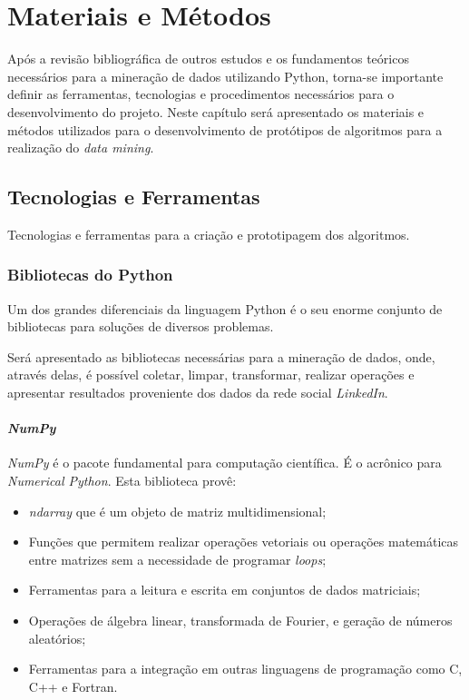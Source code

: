 \chapter{Materiais e Métodos}\label{ch:materiais-metodos}
Após a revisão bibliográfica de outros estudos e os fundamentos teóricos necessários para a mineração de dados utilizando Python, torna-se importante definir as ferramentas, tecnologias e procedimentos necessários para o desenvolvimento do projeto. Neste capítulo será apresentado os materiais e métodos utilizados para o desenvolvimento de protótipos de algoritmos para a realização do \textit{data mining}.

\section{Tecnologias e Ferramentas}
Tecnologias e ferramentas para a criação e prototipagem dos algoritmos.

\subsection{Bibliotecas do Python}\label{sec:bib_python}
Um dos grandes diferenciais da linguagem Python é o seu enorme conjunto de bibliotecas para soluções de diversos problemas.

Será apresentado as bibliotecas necessárias para a mineração de dados, onde, através delas, é possível coletar, limpar, transformar, realizar operações e apresentar resultados proveniente dos dados da rede social \textit{LinkedIn}.
 
\subsubsection{\textit{NumPy}}
\textit{NumPy} é o pacote fundamental para computação científica. É o acrônico para \textit{Numerical Python}. Esta biblioteca provê:

\begin{itemize}
    \item \textit{ndarray} que é um objeto de matriz multidimensional;
    \item Funções que permitem realizar operações vetoriais ou operações matemáticas entre matrizes sem a necessidade de programar \textit{loops};
    \item Ferramentas para a leitura e escrita em conjuntos de dados matriciais;
    \item Operações de álgebra linear, transformada de Fourier, e geração de números aleatórios;
    \item Ferramentas para a integração em outras linguagens de programação como C, C++ e Fortran.
\end{itemize}

